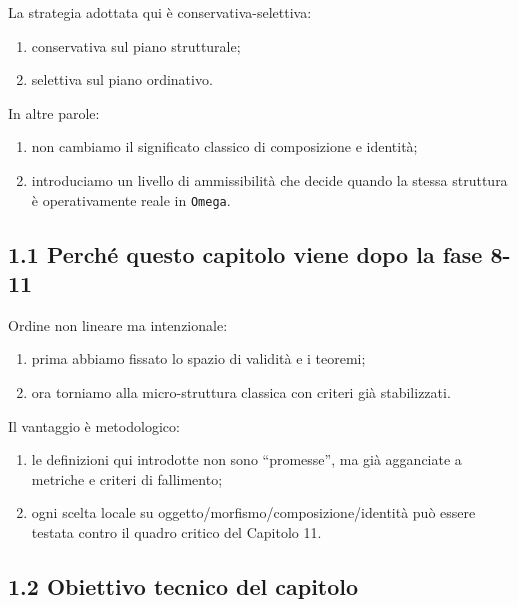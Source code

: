 La strategia adottata qui è conservativa-selettiva:

\begin{enumerate}
\def\labelenumi{\arabic{enumi}.}
\tightlist
\item
  conservativa sul piano strutturale;
\item
  selettiva sul piano ordinativo.
\end{enumerate}

In altre parole:

\begin{enumerate}
\def\labelenumi{\arabic{enumi}.}
\tightlist
\item
  non cambiamo il significato classico di composizione e identità;
\item
  introduciamo un livello di ammissibilità che decide quando la stessa struttura è operativamente reale in \texttt{Omega}.
\end{enumerate}

\subsection{1.1 Perché questo capitolo viene dopo la fase 8-11}

Ordine non lineare ma intenzionale:

\begin{enumerate}
\def\labelenumi{\arabic{enumi}.}
\tightlist
\item
  prima abbiamo fissato lo spazio di validità e i teoremi;
\item
  ora torniamo alla micro-struttura classica con criteri già stabilizzati.
\end{enumerate}

Il vantaggio è metodologico:

\begin{enumerate}
\def\labelenumi{\arabic{enumi}.}
\tightlist
\item
  le definizioni qui introdotte non sono ``promesse'', ma già agganciate a metriche e criteri di fallimento;
\item
  ogni scelta locale su oggetto/morfismo/composizione/identità può essere testata contro il quadro critico del Capitolo 11.
\end{enumerate}

\subsection{1.2 Obiettivo tecnico del capitolo}

